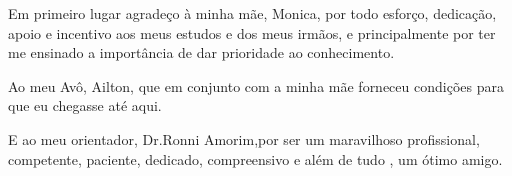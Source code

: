 \begin{agradecimentos}
Em primeiro lugar agradeço à minha mãe, Monica, por todo esforço, dedicação, apoio e incentivo aos meus estudos e dos meus irmãos, e principalmente por ter me ensinado a importância de dar prioridade ao conhecimento.
   
   Ao meu Avô, Ailton, que em conjunto com a minha mãe forneceu condições para que eu chegasse até aqui.
   
   E ao meu orientador, Dr.Ronni Amorim,por ser um maravilhoso profissional, competente, paciente, dedicado, compreensivo e além de tudo , um ótimo amigo.


\end{agradecimentos}
